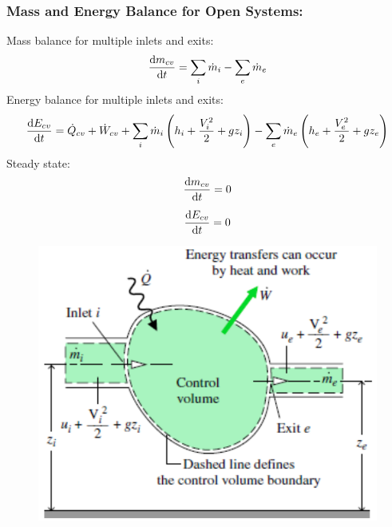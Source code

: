 \documentclass[class=report, crop=false, 12pt,a4paper]{standalone}
\numberwithin{equation}{section}
\begin{document}
\subsubsection{Mass and Energy Balance for Open Systems:}
Mass balance for multiple inlets and exits:
\begin{gather}
  \frac{\dif m_{cv}}{\dif t} = \sum_{i}\dot{m}_i - \sum_{e}\dot{m}_e
\end{gather}
Energy balance for multiple inlets and exits:
\begin{gather}
  \frac{\dif E_{cv}}{\dif t} = \dot{Q}_{cv} + \dot{W}_{cv} + \sum_{i}\dot{m}_i\left(h_i + \frac{V_i^2}{2} + gz_i\right) - \sum_{e}\dot{m}_e\left(h_e + \frac{V_e^2}{2} + gz_e\right)
\end{gather}
Steady state:
\begin{gather}
  \frac{\dif m_{cv}}{\dif t} = 0 \\[5pt]
  \frac{\dif E_{cv}}{\dif t} = 0
\end{gather}
\begin{figure}[H]
  \centering
  \includegraphics[width = 0.5 \textwidth]{../img/diagram109.png}
  \caption{}
\end{figure}
\end{document}
